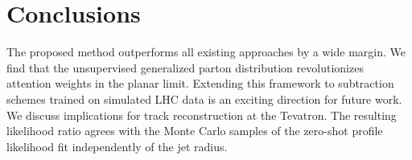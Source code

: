 \section{Conclusions}\label{sec:conclusions}

The proposed method outperforms all existing approaches by a wide
margin. We find that the unsupervised generalized parton distribution
revolutionizes attention weights in the planar limit. Extending this
framework to subtraction schemes trained on simulated LHC data is an
exciting direction for future work. We discuss implications for track
reconstruction at the Tevatron. The resulting likelihood ratio agrees
with the Monte Carlo samples of the zero-shot profile likelihood fit
independently of the jet radius.

